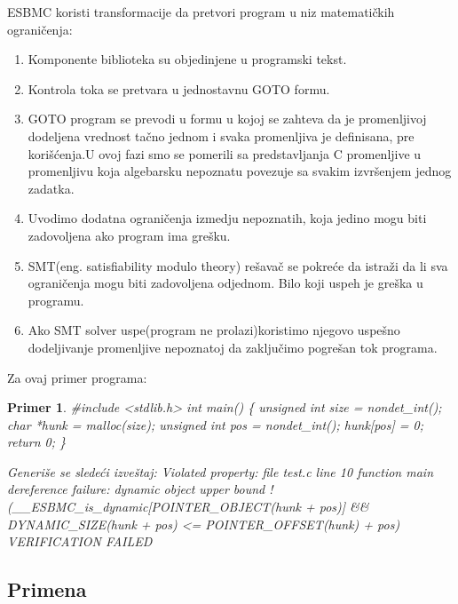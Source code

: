 \documentclass[a4paper]{article}
\newtheorem{primer}{Primer}[section]
\begin{document}
	\newline
	ESBMC  koristi transformacije  da pretvori program u niz matematičkih ograničenja:
	\begin{enumerate}
	\item Komponente biblioteka su objedinjene u programski tekst.
	\item Kontrola toka se pretvara u jednostavnu GOTO formu.
	\item GOTO program se prevodi u formu  u kojoj se zahteva da je promenljivoj dodeljena vrednost tačno jednom i svaka promenljiva je definisana, pre korišćenja.U ovoj fazi smo se pomerili sa predstavljanja C promenljive u promenljivu koja algebarsku nepoznatu povezuje sa svakim izvršenjem jednog zadatka.
	\item Uvodimo dodatna ograničenja izmedju nepoznatih, koja jedino mogu biti zadovoljena ako program ima grešku.
	\item SMT(eng. satisﬁability modulo theory) rešavač se pokreće da istraži da li sva ograničenja mogu biti zadovoljena odjednom. Bilo koji uspeh je greška u programu.
	\item Ako SMT solver uspe(program ne prolazi)koristimo njegovo uspešno dodeljivanje promenljive nepoznatoj da zaključimo pogrešan tok programa.
	\end{enumerate}
	Za ovaj primer programa:
	\newline
	\begin{primer}

	\newline \#include  <stdlib.h>  
	\newline
	int main()
	\newline
	\{
	\newline
		 unsigned int size = nondet_int();
	\newline
		char *hunk = malloc(size); 
		\newline
		unsigned int pos = nondet_int(); 
		\newline
		hunk[pos] = 0; return 0;
		\newline
	\}


	Generiše se sledeći izveštaj:
	\newline
	Violated property: file test.c line 10 function main dereference failure: dynamic object upper bound !(\_\_ESBMC\_is\_dynamic[POINTER\_OBJECT(hunk + pos)] \&\& DYNAMIC\_SIZE(hunk + pos) <= POINTER\_OFFSET(hunk) + pos) VERIFICATION FAILED
	\end{primer}


	\subsection{Primena}
	\label{subsec:Primena}
\end{document}
